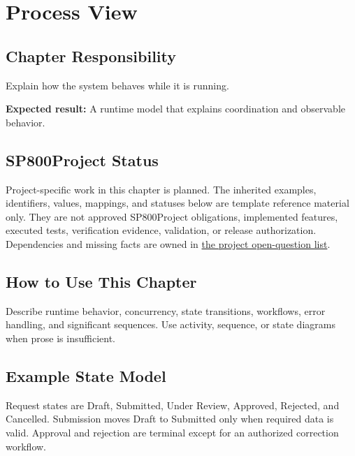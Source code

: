 \chapter{Process View}
\section{Chapter Responsibility}
\label{Section:ProcessViewResponsibility}
Explain how the system behaves while it is running.

\noindent\textbf{Expected result:} A runtime model that explains coordination and observable behavior.

\section{SP800Project Status}
\label{Section:SP800StatusProcessView}
Project-specific work in this chapter is planned. The inherited examples,
identifiers, values, mappings, and statuses below are template reference
material only. They are not approved SP800Project obligations, implemented features,
executed tests, verification evidence, validation, or release authorization.
Dependencies and missing facts are owned in
\hyperref[Section:SP800OpenQuestions]{the project open-question list}.

\section{How to Use This Chapter}
Describe runtime behavior, concurrency, state transitions, workflows, error handling, and significant sequences. Use activity, sequence, or state diagrams when prose is insufficient.
\section{Example State Model}
Request states are Draft, Submitted, Under Review, Approved, Rejected, and Cancelled. Submission moves Draft to Submitted only when required data is valid. Approval and rejection are terminal except for an authorized correction workflow.
